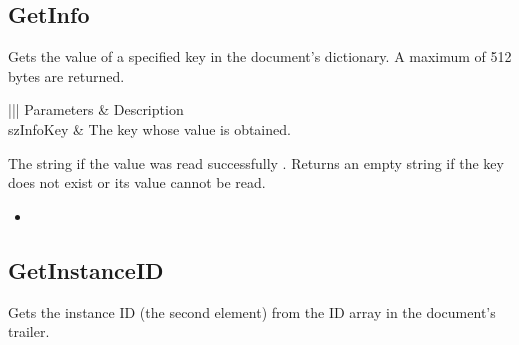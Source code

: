 \documentclass[letterpaper,12pt,english,openany,oneside]{sphinxmanual}
\begin{document}
\subsection{GetInfo}
\label{\detokenize{IAC_API_OLE_Objects:getinfo}}
Gets the value of a specified key in the document’s  dictionary. A maximum of 512 bytes are returned.


\begin{sphinxVerbatim}[commandchars=\\\{\}]
  
\end{sphinxVerbatim}
\label{\detokenize{IAC_API_OLE_Objects:parameters-57}}


\begin{savenotes}\sphinxattablestart
\centering
{}\label{\detokenize{IAC_API_OLE_Objects:section-65}}\nobreak
\begin{tabular}[t]{|||}
\hline
\sphinxstyletheadfamily 
Parameters
&\sphinxstyletheadfamily 
Description
\\
\hline
szInfoKey
&
The key whose value is obtained.
\\
\hline
\end{tabular}
\par
\sphinxattableend\end{savenotes}


The string if the value was read successfully . Returns an empty string if the key does not exist or its value cannot be read.

\label{\detokenize{IAC_API_OLE_Objects:related-methods-98}}
\begin{itemize}
\item {} 
 

\end{itemize}




\subsection{GetInstanceID}
\label{\detokenize{IAC_API_OLE_Objects:getinstanceid}}
Gets the instance ID (the second element) from the ID array in the document’s trailer.
\end{document}
